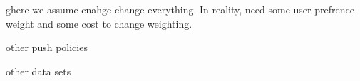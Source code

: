 ghere we assume cnahge change everything. In reality, need some user prefrence weight and some cost to change weighting.

other push policies

other data sets